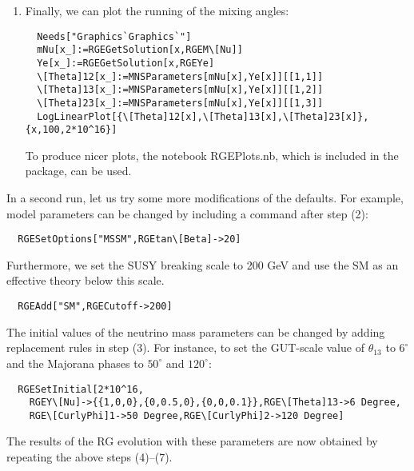 \begin{enumerate}
\item Finally, we can plot the running of the mixing angles:
\begin{verbatim}
  Needs["Graphics`Graphics`"]
  mNu[x_]:=RGEGetSolution[x,RGEM\[Nu]]
  Ye[x_]:=RGEGetSolution[x,RGEYe]
  \[Theta]12[x_]:=MNSParameters[mNu[x],Ye[x]][[1,1]]
  \[Theta]13[x_]:=MNSParameters[mNu[x],Ye[x]][[1,2]]
  \[Theta]23[x_]:=MNSParameters[mNu[x],Ye[x]][[1,3]]
  LogLinearPlot[{\[Theta]12[x],\[Theta]13[x],\[Theta]23[x]},{x,100,2*10^16}]
\end{verbatim}
To produce nicer plots, the notebook RGEPlots.nb, which is included in
the package, can be used.

\end{enumerate}


In a second run, let us try some more modifications of the defaults.
For example, model parameters can be changed by including a command
after step (2):
\begin{verbatim}
  RGESetOptions["MSSM",RGEtan\[Beta]->20]
\end{verbatim}

Furthermore, we set the SUSY breaking scale to 200 GeV and use the SM
as an effective theory below this scale.
\begin{verbatim}
  RGEAdd["SM",RGECutoff->200]
\end{verbatim}

The initial values of the neutrino mass parameters can be changed by
adding replacement rules in step (3).  For instance, to set the
GUT-scale value of $\theta_{13}$ to $6^\circ$ and the Majorana phases to
$50^\circ$ and $120^\circ$:
\begin{verbatim}
  RGESetInitial[2*10^16,
    RGEY\[Nu]->{{1,0,0},{0,0.5,0},{0,0,0.1}},RGE\[Theta]13->6 Degree,
    RGE\[CurlyPhi]1->50 Degree,RGE\[CurlyPhi]2->120 Degree]
\end{verbatim}
The results of the RG evolution with these parameters are now obtained
by repeating the above steps (4)--(7).


\endinput
